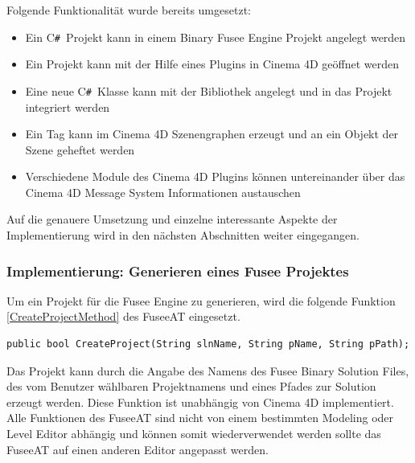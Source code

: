 \documentclass[pagesize, paper=a4, fontsize=12pt, titlepage=true, headings=small, headnosepline, abstractoff, liststotoc, nochapterprefix, plainheadsepline, twoside]{scrreprt}
\newcommand{\CSS}{C\texttt{\# }}
\begin{document}
Folgende Funktionalität wurde bereits umgesetzt:
\begin{itemize}
\item Ein \CSS Projekt kann in einem Binary Fusee Engine Projekt angelegt werden
\item Ein Projekt kann mit der Hilfe eines Plugins in Cinema 4D geöffnet werden
\item Eine neue \CSS Klasse kann mit der Bibliothek angelegt und in das Projekt integriert werden
\item Ein Tag kann im Cinema 4D Szenengraphen erzeugt und an ein Objekt der Szene geheftet werden
\item Verschiedene Module des Cinema 4D Plugins können untereinander über das Cinema 4D Message System Informationen austauschen
\end{itemize}

Auf die genauere Umsetzung und einzelne interessante Aspekte der Implementierung wird in den nächsten Abschnitten weiter eingegangen.

\subsubsection{Implementierung: Generieren eines Fusee Projektes}
Um ein Projekt für die Fusee Engine zu generieren, wird die folgende Funktion \ref{CreateProjectMethod} des FuseeAT eingesetzt. 
\begin{lstlisting}[label=CreateProjectMethod, caption=Funktion zum Generieren eines neuen Projekts in der Binary Version der Fusee Engine.]
	public bool CreateProject(String slnName, String pName, String pPath);
\end{lstlisting}
Das Projekt kann durch die Angabe des Namens des Fusee Binary Solution Files, des vom Benutzer wählbaren Projektnamens und eines Pfades zur Solution erzeugt werden. Diese Funktion ist unabhängig von Cinema 4D implementiert. Alle Funktionen des FuseeAT sind nicht von einem bestimmten Modeling oder Level Editor abhängig und können somit wiederverwendet werden sollte das FuseeAT auf einen anderen Editor angepasst werden.
\end{document}
